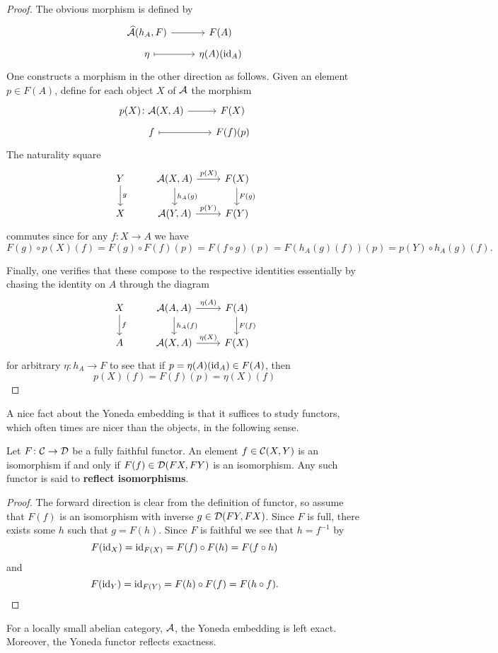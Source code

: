 \documentclass[reqno, 12pt]{amsart}
\begin{document}
\begin{proof}
  The obvious morphism is defined by
  $$\begin{tikzcd}[row sep=tiny]
    \widehat{\A}(h_A, F) \arrow{r} & F(A)\\
    \eta \arrow[mapsto]{r} & \eta(A)(\id_A)
  \end{tikzcd}$$
  One constructs a morphism in the other direction as follows.
  Given an element $p \in F(A)$, define for each object $X$ of $\mathcal{A}$ the morphism
  $$\begin{tikzcd}[row sep=tiny]
    p(X) \colon \A(X,A) \arrow{r} & F(X)\\
    f \arrow[mapsto]{r} & F(f)(p)
  \end{tikzcd}$$
  The naturality square
  $$\begin{tikzcd}
    Y \arrow{d}{g} & \A(X,A) \arrow{d}{h_A(g)}\arrow{r}{p(X)} & F(X)\arrow{d}{F(g)}\\
    X & \A(Y,A) \arrow{r}{p(Y)} & F(Y)
  \end{tikzcd}$$
  commutes since for any $f \colon X \to A$ we have
  $$F(g) \circ p(X)(f) = F(g) \circ F(f)(p) = F(f \circ g)(p) = F(h_A(g)(f))(p) = p(Y) \circ h_A(g)(f).$$

  Finally, one verifies that these compose to the respective identities essentially by chasing the identity on $A$ through the diagram
  $$\begin{tikzcd}
    X\arrow{d}{f} & \A(A,A) \arrow{d}{h_A(f)}\arrow{r}{\eta(A)}& F(A)\arrow{d}{F(f)}\\
    A & \A(X,A) \arrow{r}{\eta(X)} & F(X)
  \end{tikzcd}$$
  for arbitrary $\eta \colon h_A \to F$ to see that if $p = \eta(A)(\operatorname{id}_A) \in F(A)$, then
  $$p(X)(f) = F(f)(p) = \eta(X)(f)$$
\end{proof}

A nice fact about the Yoneda embedding is that it suffices to study functors, which often times are nicer than the objects, in the following sense.

\begin{proposition}
  Let $F \colon \mathcal{C} \to \mathcal{D}$ be a fully faithful functor.
  An element $f \in \mathcal{C}(X,Y)$ is an isomorphism if and only if $F(f) \in \mathcal{D}(FX,FY)$ is an isomorphism.
  Any such functor is said to \textbf{reflect isomorphisms}.
\end{proposition}

\begin{proof}
  The forward direction is clear from the definition of functor, so assume that $F(f)$ is an isomorphism with inverse $g \in \mathcal{D}(FY, FX)$.
  Since $F$ is full, there exists some $h$ such that $g = F(h)$.
  Since $F$ is faithful we see that $h = f^{-1}$ by
  $$F(\operatorname{id}_X) = \operatorname{id}_{F(X)} =  F(f) \circ F(h) = F(f \circ h)$$
  and
  $$F(\operatorname{id}_Y) = \operatorname{id}_{F(Y)} =  F(h) \circ F(f) = F(h \circ f).$$
\end{proof}
\begin{proposition}
  For a locally small abelian category, $\mathcal{A}$, the Yoneda embedding is left exact.
  Moreover, the Yoneda functor reflects exactness.
\end{proposition}
\end{document}
